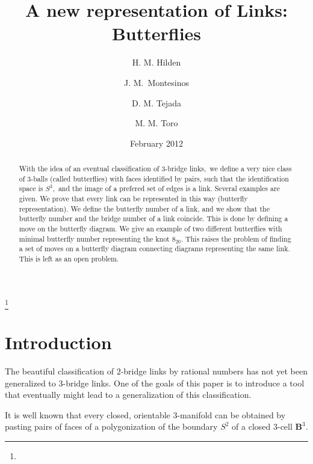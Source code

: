 \documentclass{amsproc}\usepackage{eurosym}
\theoremstyle{plain}
\numberwithin{equation}{section}
\begin{document}
\title[A new representation of Links: Butterflies]{A new representation of Links: Butterflies}
\author{H. M. Hilden}
\address{University of Hawaii at Honolulu}
\author{J. M.\ Montesinos}
\author{D. M. Tejada }
\author{M. M. Toro}
\thanks{}
\date{February 2012}

\begin{abstract}
With the idea of an eventual classification of 3-bridge links,\ we define a
very nice class of $3$-balls (called butterflies) with faces identified by
pairs, such that the identification space is $S^{3},$ and the image of a
prefered set of edges is a link. Several examples are given. We prove that
every link can be represented in this way (butterfly representation). We
define the butterfly number of a link, and we show that the butterfly number
and the bridge number of a link coincide. This is done by defining a move on
the butterfly diagram. We give an example of two different butterflies with
minimal butterfly number representing the knot $8_{20}.$ This raises the
problem of finding a set of moves on a butterfly diagram connecting diagrams
representing the same link. This is left as an open problem.

\end{abstract}
\maketitle


\section{\label{Intro}Introduction}

The beautiful classification of $2$-bridge links by rational numbers has not
yet been generalized to 3-bridge links. One of the goals of this paper is to
introduce a tool that eventually might lead to a generalization of this classification.

It is well known \cite{seifert} that every closed, orientable $3$-manifold can
be obtained by pasting pairs of faces of a polygonization of the boundary
$S^{2}$ of a closed $3$-cell $\mathbf{B}^{3}$.
\end{document}
